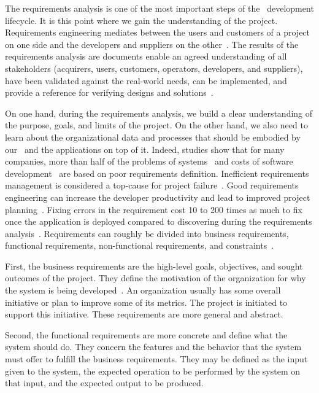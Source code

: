 %
%
The requirements analysis is one of the most important steps of the \db\ development lifecycle.
It is this point where we gain the understanding of the project.
Requirements engineering mediates between the users and customers of a project on one side and the developers and suppliers on the other~\cite{ISOIECIEEE2018SASELCPRE}.
The results of the requirements analysis are  documents enable an agreed understanding of all stakeholders (acquirers, users, customers, operators, developers, and suppliers), have been validated against the real-world needs, can be implemented, and provide a reference for verifying designs and solutions~\cite{ISOIECIEEE2018SASELCPRE}.

On one hand, during the requirements analysis, we build a clear understanding of the purpose, goals, and limits of the project.
On the other hand, we also need to learn about the organizational data and processes that should be embodied by our \db\ and the applications on top of it.
Indeed, studies show that for many companies, more than half of the problems of systems~\cite{Z2003RDARS} and costs of software development~\cite{IC2009BAB2TPTS} are based on poor requirements definition.
Inefficient requirements management is considered a top-cause for project failure~\cite{EDN2005RUIFACI}.
Good requirements engineering can increase the developer productivity and lead to improved project planning~\cite{DCVP2005READSDFFAC}.
Fixing errors in the requirement cost 10 to 200 times as much to fix once the application is deployed compared to discovering during the requirements analysis~\cite{BP1988UACSC,M2001FTEAOOP,RGJ2023EASARBFSAR}.%
%
Requirements can roughly be divided into business requirements, functional requirements, non-functional requirements, and constraints~\cite{I2018SAH}.

First, the business requirements are the high-level goals, objectives, and sought outcomes of the project.
They define the motivation of the organization for why the system is being developed~\cite{ISOIECIEEE2018SASELCPRE}.
An organization usually has some overall initiative or plan to improve some of its metrics.
The project is initiated to support this initiative.
These requirements are more general and abstract.

Second, the functional requirements are more concrete and define what the system should do.
They concern the features and the behavior that the system must offer to fulfill the business requirements.
They may be defined as the input given to the system, the expected operation to be performed by the system on that input, and the expected output to be produced.

